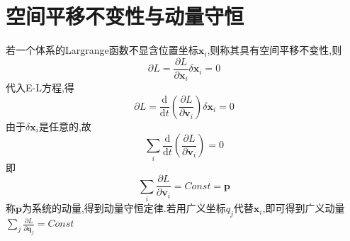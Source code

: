\section{空间平移不变性与动量守恒}
若一个体系的Largrange函数不显含位置坐标$\boldsymbol{x}_i$,则称其具有空间平移不变性,则
\begin{equation}
\partial L = 
\frac{\partial L}{\partial\boldsymbol{x}_i}\delta \boldsymbol{x}_i = 0
\end{equation}
代入E-L方程,得
\begin{equation}
\partial L = 
\frac{\mathrm{d}}{\mathrm{d}t}
\left(
\frac{\partial L}{\partial \boldsymbol{v}_i}
\right)\delta\boldsymbol{x}_i = 0
\end{equation}
由于$\delta\boldsymbol{x}_i$是任意的,故
\begin{equation}
\sum_{i}\frac{\mathrm{d}}{\mathrm{d}t}
\left(
\frac{\partial L}{\partial \boldsymbol{v}_i}
\right) = 0
\end{equation}
即
\begin{equation}
\sum_{i}\frac{\partial L}{\partial \boldsymbol{v}_i} = Const= \boldsymbol{p}
\end{equation}
称$\boldsymbol{p}$为系统的动量,得到动量守恒定律.若用广义坐标$q_j$代替$\boldsymbol{x}_i$,即可得到广义动量$\sum_{j}\frac{\partial L}{\partial \boldsymbol{q}_j} = Const$

